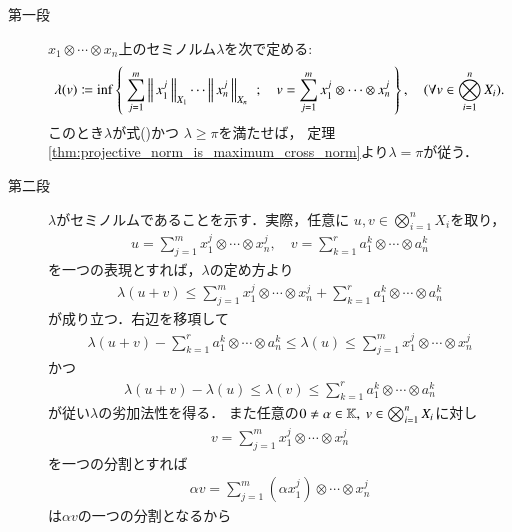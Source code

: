 	\begin{prf}\mbox{}
		\begin{description}
			\item[第一段]
				$x_1 \otimes \cdots \otimes x_n$上のセミノルム$\lambda$を次で定める:
				\begin{align}
					\lambda(v) \coloneqq \operatorname*{inf}_{} \left\{\ \sum_{j=1}^m \left\|\, x^j_1\, \right\|_{X_1} \cdots \left\|\, x^j_n\, \right\|_{X_n}\ \, ; \quad 
					v = \sum_{j=1}^m x^j_1 \otimes \cdots \otimes x^j_n\ \right\},
					\quad (\forall v \in \bigotimes_{i=1}^n X_i).
				\end{align}
				このとき$\lambda$が式()かつ
				$\lambda \geq \pi$を満たせば，
				定理\ref{thm:projective_norm_is_maximum_cross_norm}より$\lambda = \pi$が従う．
				
			\item[第二段]
				$\lambda$がセミノルムであることを示す．実際，任意に
				$u,v \in \bigotimes_{i=1}^n X_i$を取り，
				\begin{align}
					u = \sum_{j=1}^{m} x^j_1 \otimes \cdots \otimes x^j_n,
					\quad v = \sum_{k=1}^r a^k_1 \otimes \cdots \otimes a^k_n
				\end{align}
				を一つの表現とすれば，$\lambda$の定め方より
				\begin{align}
					\lambda(u+v) \leq \sum_{j=1}^{m} x^j_1 \otimes \cdots \otimes x^j_n 
						+ \sum_{k=1}^r a^k_1 \otimes \cdots \otimes a^k_n
				\end{align}
				が成り立つ．右辺を移項して
				\begin{align}
					\lambda(u+v) - \sum_{k=1}^r a^k_1 \otimes \cdots \otimes a^k_n 
					\leq \lambda(u) 
					\leq \sum_{j=1}^{m} x^j_1 \otimes \cdots \otimes x^j_n
				\end{align}
				かつ
				\begin{align}
					\lambda(u+v) - \lambda(u) \leq \lambda(v) \leq \sum_{k=1}^r a^k_1 \otimes \cdots \otimes a^k_n 
				\end{align}
				が従い$\lambda$の劣加法性を得る．
				また任意の$0 \neq \alpha \in \mathbb{K},\ v \in \bigotimes_{i=1}^n X_i$に対し
				\begin{align}
					v = \sum_{j=1}^{m} x^j_1 \otimes \cdots \otimes x^j_n
				\end{align}
				を一つの分割とすれば
				\begin{align}
					\alpha v = \sum_{j=1}^{m} \left( \alpha x^j_1 \right) \otimes \cdots \otimes x^j_n
				\end{align}
				は$\alpha v$の一つの分割となるから
				\begin{align}

\end{align}
\end{description}
\end{prf}
